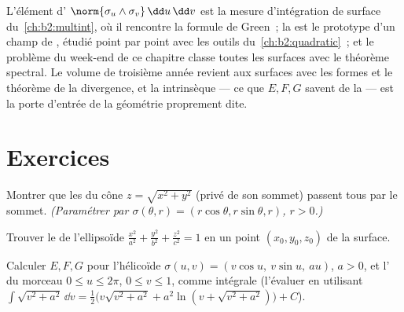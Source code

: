 \begin{remark}
L'élément d' $\norm{\sigma_u\wedge\sigma_v}\,\dd u\,\dd v$
est la mesure d'intégration de surface du~\cref{ch:b2:multint}, où
il rencontre la formule de Green~; la 
est le prototype d'un champ de , étudié point
par point avec les outils du~\cref{ch:b2:quadratic}~; et le
problème du week-end de ce chapitre classe toutes les surfaces
 avec le théorème spectral. Le volume de troisième année
revient aux surfaces avec les formes  et le
théorème de la divergence, et la  intrinsèque --- ce que
$E, F, G$ savent de la  --- est la porte d'entrée de la
géométrie  proprement dite.
\end{remark}

\section{Exercices}

\begin{exercise}[$\star$]\label{exo:b2:surfaces:1}
Montrer que les  du cône $z = \sqrt{x^2 + y^2}$
(privé de son sommet) passent tous par le sommet. \emph{(Paramétrer par
$\sigma(\theta, r) = (r\cos\theta, r\sin\theta, r)$, $r > 0$.)}
\end{exercise}

\begin{exercise}[$\star$]\label{exo:b2:surfaces:2}
Trouver le  de l'ellipsoïde $\frac{x^2}{a^2} +
\frac{y^2}{b^2} + \frac{z^2}{c^2} = 1$ en un point $(x_0, y_0,
z_0)$ de la surface.
\end{exercise}

\begin{exercise}[$\star$]\label{exo:b2:surfaces:3}
Calculer $E, F, G$ pour l'hélicoïde $\sigma(u, v) = (v\cos u,\
v\sin u,\ au)$, $a > 0$, et l' du morceau $0 \leq u \leq
2\pi$, $0 \leq v \leq 1$, comme intégrale (l'évaluer en utilisant
$\int\sqrt{v^2 + a^2}\,\dd v = \frac12\bigl(v\sqrt{v^2+a^2} +
a^2\ln(v + \sqrt{v^2 + a^2})\bigr) + C$).
\end{exercise}

